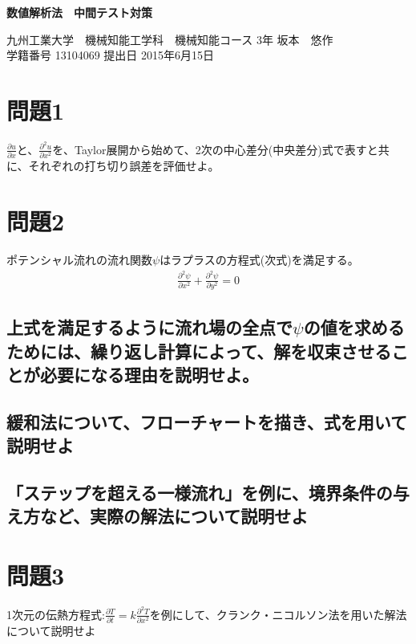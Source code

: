 \documentclass[a4j,twoside,openright,11pt]{jarticle}
\begin{document}
\begin{screen}
\huge
\begin{center}
{\bf 数値解析法　中間テスト対策}\\
\end{center}

\normalsize
\begin{flushright}
九州工業大学　機械知能工学科　機械知能コース 3年 坂本　悠作\\学籍番号 13104069 \hspace{0.2in}提出日 2015年6月15日
\end{flushright}
\end{screen}

\section{問題1}
$\frac{\partial u}{\partial x}$と、$\frac{\partial^2 u}{\partial x^2}$を、Taylor展開から始めて、2次の中心差分(中央差分)式で表すと共に、それぞれの打ち切り誤差を評価せよ。

\section{問題2}
ポテンシャル流れの流れ関数$\psi$はラプラスの方程式(次式)を満足する。
\begin{eqnarray}
\frac{\partial^2 \psi}{\partial x^2} + \frac{\partial^2 \psi}{\partial y^2} = 0
\end{eqnarray}

\subsection{上式を満足するように流れ場の全点で$\psi$の値を求めるためには、繰り返し計算によって、解を収束させることが必要になる理由を説明せよ。}
\subsection{緩和法について、フローチャートを描き、式を用いて説明せよ}
\subsection{「ステップを超える一様流れ」を例に、境界条件の与え方など、実際の解法について説明せよ}

\section{問題3}
1次元の伝熱方程式:$\frac{\partial T}{\partial t} = k \frac{\partial^2 T}{\partial x^2}$を例にして、クランク・ニコルソン法を用いた解法について説明せよ
\end{document}
